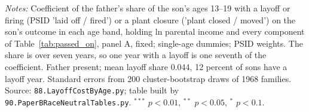 \begin{table}[!htbp]
\par\smallskip
\begin{minipage}{\textwidth}\footnotesize \textit{Notes:} Coefficient of the father's share of the son's ages 13--19 with a layoff or firing (PSID 'laid off / fired') or a plant closure ('plant closed / moved') on the son's outcome in each age band, holding ln parental income and every component of Table~\ref{tab:passed_on}, panel A, fixed; single-age dummies; PSID weights. The share is over seven years, so one year with a layoff is one seventh of the coefficient. Father present; mean layoff share 0.044, 12 percent of sons have a layoff year. Standard errors from 200 cluster-bootstrap draws of 1968 families. Source: \texttt{88.LayoffCostByAge.py}; table built by \texttt{90.PaperBRaceNeutralTables.py}. $^{***}$ $p<0.01$, $^{**}$ $p<0.05$, $^{*}$ $p<0.1$.\end{minipage}
\end{table}
